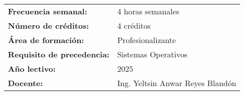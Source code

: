 \begin{center}
\begin{tabular}{p{7.5cm} p{8cm}}
		\large \textbf{Frecuencia semanal:}            & \large 4 horas semanales\vspace{0.5cm}                                                             \\
		\large \textbf{Número de créditos:}            & \large 4 créditos\vspace{0.5cm}                                                                    \\
		\large \textbf{Área de formación:}             & \large Profesionalizante\vspace{0.5cm}                                                             \\
		\large \textbf{Requisito de precedencia:}      & \large Sistemas Operativos\vspace{0.5cm}                                                           \\
		\large \textbf{Año lectivo:}                   & \large 2025\vspace{0.5cm}                                                                          \\
		\large \textbf{Docente:}                       & \large Ing. Yeltsin Anwar Reyes Blandón                                                            \\
	\end{tabular}
\end{center}